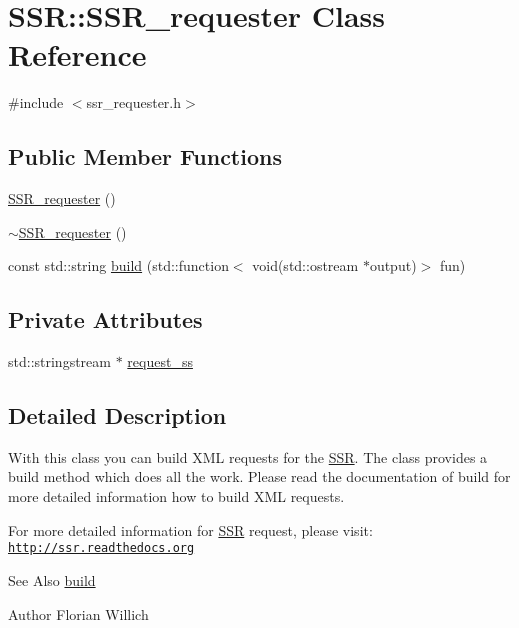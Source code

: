 \hypertarget{classSSR_1_1SSR__requester}{\section{S\-S\-R\-:\-:S\-S\-R\-\_\-requester Class Reference}
\label{classSSR_1_1SSR__requester}
}


{\ttfamily \#include $<$ssr\-\_\-requester.\-h$>$}

\subsection*{Public Member Functions}
\begin{DoxyCompactItemize}
\item 
\hyperlink{classSSR_1_1SSR__requester_a64099ad3a98b8cd909961aad04a32858}{S\-S\-R\-\_\-requester} ()
\item 
\hyperlink{classSSR_1_1SSR__requester_abf1b1504ecdb0f0164f52327a9022eb2}{$\sim$\-S\-S\-R\-\_\-requester} ()
\item 
const std\-::string \hyperlink{classSSR_1_1SSR__requester_a12e16372ec9efbca90653e92e4b64af6}{build} (std\-::function$<$ void(std\-::ostream $\ast$output)$>$ fun)
\end{DoxyCompactItemize}
\subsection*{Private Attributes}
\begin{DoxyCompactItemize}
\item 
std\-::stringstream $\ast$ \hyperlink{classSSR_1_1SSR__requester_af84b6008c29f0403d75c15c5c0e1d3a8}{request\-\_\-ss}
\end{DoxyCompactItemize}


\subsection{Detailed Description}
With this class you can build X\-M\-L requests for the \hyperlink{namespaceSSR}{S\-S\-R}. The class provides a build method which does all the work. Please read the documentation of {\ttfamily build} for more detailed information how to build X\-M\-L requests.

For more detailed information for \hyperlink{namespaceSSR}{S\-S\-R} request, please visit\-: \href{http://ssr.readthedocs.org}{\tt http\-://ssr.\-readthedocs.\-org}

\begin{DoxySeeAlso}{See Also}
\hyperlink{classSSR_1_1SSR__requester_a12e16372ec9efbca90653e92e4b64af6}{build} 
\end{DoxySeeAlso}
\begin{DoxyAuthor}{Author}
Florian Willich 
\end{DoxyAuthor}


